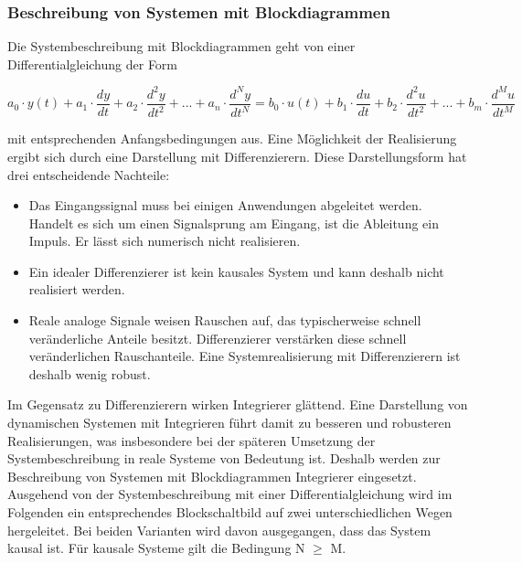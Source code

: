 \subsubsection{Beschreibung von Systemen mit Blockdiagrammen} \label{threefiveone}

\noindent Die Systembeschreibung mit Blockdiagrammen geht von einer Differentialgleichung der Form

\begin{equation}\label{eq:threehundredninetytwo}
a_{0}\cdot y(t) + a_{1}\cdot \frac{dy}{dt}+a_{2}\cdot \frac{d^2y}{dt^2}+ ... +a_{n}\cdot \frac{d^Ny}{dt^N}=
b_{0}\cdot u(t) + b_{1}\cdot \frac{du}{dt}+b_{2}\cdot \frac{d^2u}{dt^2}+ ... +b_{m}\cdot \frac{d^Mu}{dt^M}
\end{equation}

\noindent mit entsprechenden Anfangsbedingungen aus. Eine Möglichkeit der Realisierung ergibt sich durch eine
Darstellung mit Differenzierern. Diese Darstellungsform hat drei entscheidende Nachteile:

\begin{itemize}
    \item Das Eingangssignal muss bei einigen Anwendungen abgeleitet werden. Handelt es sich um
einen Signalsprung am Eingang, ist die Ableitung ein Impuls. Er lässt sich numerisch nicht
realisieren.
    \item Ein idealer Differenzierer ist kein kausales System und kann deshalb nicht realisiert werden.
    \item Reale analoge Signale weisen Rauschen auf, das typischerweise schnell veränderliche Anteile
besitzt. Differenzierer verstärken diese schnell veränderlichen Rauschanteile. Eine
Systemrealisierung mit Differenzierern ist deshalb wenig robust.
\end{itemize}

\noindent Im Gegensatz zu Differenzierern wirken Integrierer glättend. Eine Darstellung von dynamischen
Systemen mit Integrieren führt damit zu besseren und robusteren Realisierungen, was insbesondere bei
der späteren Umsetzung der Systembeschreibung in reale Systeme von Bedeutung ist. Deshalb werden zur Beschreibung von Systemen mit Blockdiagrammen Integrierer eingesetzt. Ausgehend von der Systembeschreibung mit einer Differentialgleichung wird im Folgenden ein entsprechendes Blockschaltbild auf zwei unterschiedlichen Wegen hergeleitet. Bei beiden Varianten wird davon ausgegangen, dass das System kausal ist. Für kausale Systeme gilt die Bedingung N $\geqslant$ M.\bigskip

